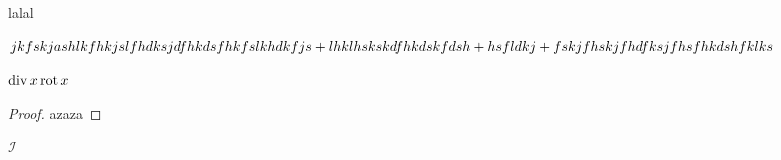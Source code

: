 \documentclass{article}
\begin{document}
    
    \fsrheader
    
    \begin{thm}
        lalal
    \end{thm}
    
    
    $jkfskjashlkfhkjslfhdksjdfhkdsfhkfslkhdkfjs+lhklhskskdfhkdskfdsh\hm+ hsfldkj\hm+fskjfhskjfhdfksjfhsfhkdshfklks$
    
    $\mathop{\operatorname{div}} x \operatorname{rot} x$
    
    \begin{proof}
    azaza
    \end{proof}
    
    $\mathcal{I}$
    
\end{document}
